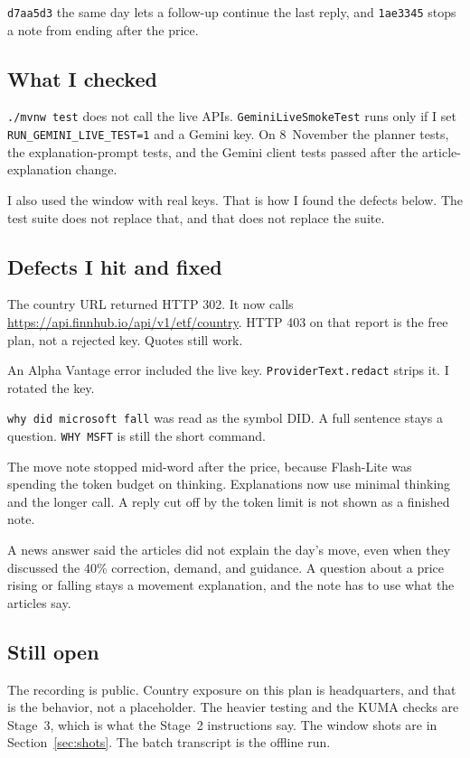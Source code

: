 \documentclass[11pt]{article}
\begin{document}
\texttt{d7aa5d3} the same day lets a follow-up continue the last reply, and \texttt{1ae3345} stops a note from ending after the price.

\subsection{What I checked}
\texttt{./mvnw test} does not call the live APIs. \texttt{GeminiLiveSmokeTest} runs only if I set \texttt{RUN\_GEMINI\_LIVE\_TEST=1} and a Gemini key. On 8~November the planner tests, the explanation-prompt tests, and the Gemini client tests passed after the article-explanation change.

I also used the window with real keys. That is how I found the defects below. The test suite does not replace that, and that does not replace the suite.

\subsection{Defects I hit and fixed}
The country URL returned HTTP 302. It now calls \url{https://api.finnhub.io/api/v1/etf/country}. HTTP 403 on that report is the free plan, not a rejected key. Quotes still work.

An Alpha Vantage error included the live key. \texttt{ProviderText.redact} strips it. I rotated the key.

\texttt{why did microsoft fall} was read as the symbol DID. A full sentence stays a question. \texttt{WHY MSFT} is still the short command.

The move note stopped mid-word after the price, because Flash-Lite was spending the token budget on thinking. Explanations now use minimal thinking and the longer call. A reply cut off by the token limit is not shown as a finished note.

A news answer said the articles did not explain the day's move, even when they discussed the 40\% correction, demand, and guidance. A question about a price rising or falling stays a movement explanation, and the note has to use what the articles say.

\subsection{Still open}
The recording is public. Country exposure on this plan is headquarters, and that is the behavior, not a placeholder. The heavier testing and the KUMA checks are Stage~3, which is what the Stage~2 instructions say. The window shots are in Section~\ref{sec:shots}. The batch transcript is the offline run.
\end{document}
